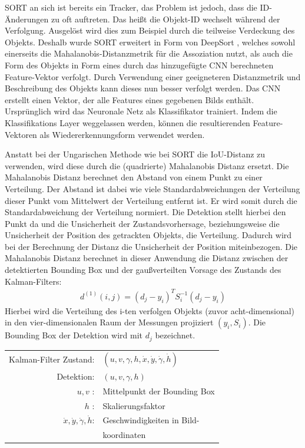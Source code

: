 \documentclass[conference]{IEEEtran}
\begin{document}
	SORT an sich ist bereits ein Tracker, das Problem ist jedoch, dass die ID-Änderungen zu oft auftreten. Das heißt die Objekt-ID wechselt während der Verfolgung. Ausgelöst wird dies zum Beispiel durch die teilweise Verdeckung des Objekts. Deshalb wurde SORT erweitert in Form von DeepSort \cite{deepSort}, welches sowohl einerseits die Mahalanobis-Distanzmetrik für die Assoziation nutzt, als auch die Form des Objekts in Form eines durch das hinzugefügte CNN berechneten Feature-Vektor verfolgt. Durch Verwendung einer geeigneteren Distanzmetrik und Beschreibung des Objekts kann dieses nun besser verfolgt werden.
	Das CNN erstellt einen Vektor, der alle Features eines gegebenen Bilds enthält. Ursprünglich wird das Neuronale Netz als Klassifikator trainiert. Indem die Klassifikations Layer weggelassen werden, können die resultierenden Feature-Vektoren als Wiedererkennungsform verwendet werden.
	
	Anstatt bei der Ungarischen Methode wie bei SORT die IoU-Distanz zu verwenden, wird diese durch die (quadrierte) Mahalanobis Distanz ersetzt. Die Mahalanobis Distanz berechnet den Abstand von einem Punkt zu einer Verteilung. Der Abstand ist dabei wie viele Standardabweichungen der Verteilung dieser Punkt vom Mittelwert der Verteilung entfernt ist. Er wird somit durch die Standardabweichung der Verteilung normiert. Die Detektion stellt hierbei den Punkt da und die Unsicherheit der Zustandsvorhersage, beziehungsweise die Unsicherheit der Position des getrackten Objekts, die Verteilung. Dadurch wird bei der Berechnung der Distanz die Unsicherheit der Position miteinbezogen. 
	Die Mahalanobis Distanz berechnet in dieser Anwendung die Distanz zwischen der detektierten Bounding Box und der gaußverteilten Vorsage des Zustands des Kalman-Filters:
	\begin{align}
		d^{(1)}(i,j)= (d_j - y_i)^TS^{-1}_i(d_j - y_i)
	\end{align}
	Hierbei wird die Verteilung des i-ten verfolgen Objekts (zuvor acht-dimensional) in den vier-dimensionalen Raum der Messungen projiziert $(y_i, S_i)$. Die Bounding Box der Detektion wird mit $d_j$ bezeichnet. \\
	
	
	\begin{tabular}{r l}
		Kalman-Filter Zustand: & $(u,v,\gamma,h,\dot{x},\dot{y},\dot{\gamma},\dot{h})$ \\
		Detektion: & $(u,v,\gamma,h)$ \\
		$u,v$ :& Mittelpunkt der Bounding Box \\
		$h$ :& Skalierungsfaktor \\
		$\dot{x},\dot{y},\dot{\gamma},\dot{h}$: & Geschwindigkeiten in Bild- \\	
		& koordinaten \\
	\end{tabular} \\
	
\end{document}
